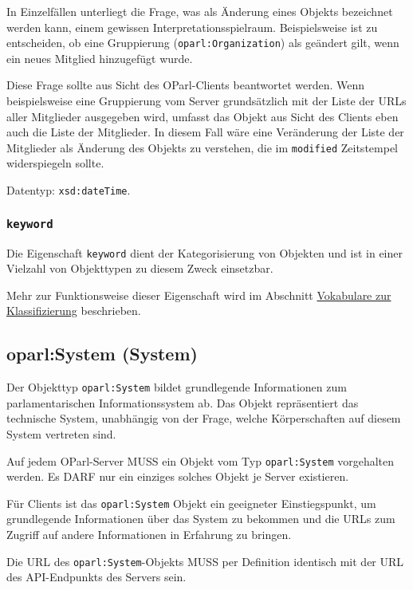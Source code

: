 \documentclass[,a4paper]{article}
\begin{document}
In Einzelfällen unterliegt die Frage, was als Änderung eines Objekts
bezeichnet werden kann, einem gewissen Interpretationsspielraum.
Beispielsweise ist zu entscheiden, ob eine Gruppierung
(\texttt{oparl:Organization}) als geändert gilt, wenn ein neues Mitglied
hinzugefügt wurde.

Diese Frage sollte aus Sicht des OParl-Clients beantwortet werden. Wenn
beispielsweise eine Gruppierung vom Server grundsätzlich mit der Liste
der URLs aller Mitglieder ausgegeben wird, umfasst das Objekt aus Sicht
des Clients eben auch die Liste der Mitglieder. In diesem Fall wäre eine
Veränderung der Liste der Mitglieder als Änderung des Objekts zu
verstehen, die im \texttt{modified} Zeitstempel widerspiegeln sollte.

Datentyp: \texttt{xsd:dateTime}.

\subsubsection{\texttt{keyword}}\label{keyword}

Die Eigenschaft \texttt{keyword} dient der Kategorisierung von Objekten
und ist in einer Vielzahl von Objekttypen zu diesem Zweck einsetzbar.

Mehr zur Funktionsweise dieser Eigenschaft wird im Abschnitt
\hyperref[vokabulareux5fklassifizierung]{Vokabulare zur Klassifizierung}
beschrieben.

\subsection{oparl:System (System)}\label{oparlux5fsystem}

Der Objekttyp \texttt{oparl:System} bildet grundlegende Informationen
zum parlamentarischen Informationssystem ab. Das Objekt repräsentiert
das technische System, unabhängig von der Frage, welche Körperschaften
auf diesem System vertreten sind.

Auf jedem OParl-Server MUSS ein Objekt vom Typ \texttt{oparl:System}
vorgehalten werden. Es DARF nur ein einziges solches Objekt je Server
existieren.

Für Clients ist das \texttt{oparl:System} Objekt ein geeigneter
Einstiegspunkt, um grundlegende Informationen über das System zu
bekommen und die URLs zum Zugriff auf andere Informationen in Erfahrung
zu bringen.

Die URL des \texttt{oparl:System}-Objekts MUSS per Definition identisch
mit der URL des API-Endpunkts des Servers sein.
\end{document}
